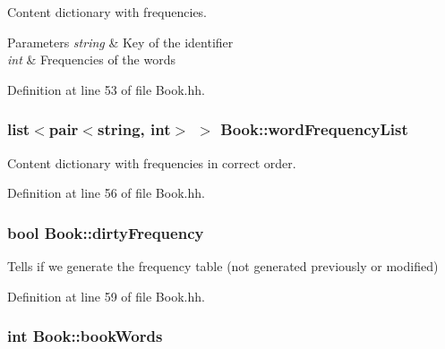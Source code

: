 Content dictionary with frequencies. 


\begin{DoxyParams}{Parameters}
{\em string} & Key of the identifier \\
\hline
{\em int} & Frequencies of the words \\
\hline
\end{DoxyParams}


Definition at line 53 of file Book.\+hh.

\subsubsection[{\texorpdfstring{word\+Frequency\+List}{wordFrequencyList}}]{\setlength{\rightskip}{0pt plus 5cm}list$<$pair$<$string, int$>$ $>$ Book\+::word\+Frequency\+List\hspace{0.3cm}{\ttfamily [private]}}\hypertarget{class_book_aa9035db1c21cf61eb3af84ad69829069}{}\label{class_book_aa9035db1c21cf61eb3af84ad69829069}


Content dictionary with frequencies in correct order. 



Definition at line 56 of file Book.\+hh.

\subsubsection[{\texorpdfstring{dirty\+Frequency}{dirtyFrequency}}]{\setlength{\rightskip}{0pt plus 5cm}bool Book\+::dirty\+Frequency\hspace{0.3cm}{\ttfamily [private]}}\hypertarget{class_book_ad1df1050750f0605efdfab51b86c0765}{}\label{class_book_ad1df1050750f0605efdfab51b86c0765}


Tells if we generate the frequency table (not generated previously or modified) 



Definition at line 59 of file Book.\+hh.

\subsubsection[{\texorpdfstring{book\+Words}{bookWords}}]{\setlength{\rightskip}{0pt plus 5cm}int Book\+::book\+Words\hspace{0.3cm}{\ttfamily [private]}}\hypertarget{class_book_a36f1e0b30a0ad17606976556cab45a23}{}\label{class_book_a36f1e0b30a0ad17606976556cab45a23}


